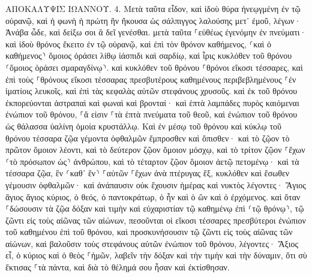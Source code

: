 \documentclass[twoside, 9pt]{extreport}
\begin{document}
ΑΠΟΚΑΛΥΨΙΣ ΙΩΑΝΝΟΥ.
4.
Μετὰ ταῦτα εἶδον, καὶ ἰδοὺ θύρα ἠνεῳγμένη ἐν τῷ οὐρανῷ, καὶ ἡ φωνὴ ἡ πρώτη ἣν ἤκουσα ὡς σάλπιγγος λαλούσης μετ᾽ ἐμοῦ, λέγων· Ἀνάβα ὧδε, καὶ δείξω σοι ἃ δεῖ γενέσθαι. μετὰ ταῦτα 
⸀εὐθέως ἐγενόμην ἐν πνεύματι· καὶ ἰδοὺ θρόνος ἔκειτο ἐν τῷ οὐρανῷ, καὶ ἐπὶ τὸν θρόνον καθήμενος, 
⸂καὶ ὁ καθήμενος⸃ ὅμοιος ὁράσει λίθῳ ἰάσπιδι καὶ σαρδίῳ, καὶ ἶρις κυκλόθεν τοῦ θρόνου ⸂ὅμοιος ὁράσει σμαραγδίνῳ⸃. 
καὶ κυκλόθεν τοῦ θρόνου ⸀θρόνοι εἴκοσι τέσσαρες, καὶ ἐπὶ τοὺς ⸀θρόνους εἴκοσι τέσσαρας πρεσβυτέρους καθημένους περιβεβλημένους ⸀ἐν ἱματίοις λευκοῖς, καὶ ἐπὶ τὰς κεφαλὰς αὐτῶν στεφάνους χρυσοῦς. 
καὶ ἐκ τοῦ θρόνου ἐκπορεύονται ἀστραπαὶ καὶ φωναὶ καὶ βρονταί· καὶ ἑπτὰ λαμπάδες πυρὸς καιόμεναι ἐνώπιον τοῦ θρόνου, ⸀ἅ εἰσιν ⸀τὰ ἑπτὰ πνεύματα τοῦ θεοῦ, 
καὶ ἐνώπιον τοῦ θρόνου ὡς θάλασσα ὑαλίνη ὁμοία κρυστάλλῳ. Καὶ ἐν μέσῳ τοῦ θρόνου καὶ κύκλῳ τοῦ θρόνου τέσσαρα ζῷα γέμοντα ὀφθαλμῶν ἔμπροσθεν καὶ ὄπισθεν· 
καὶ τὸ ζῷον τὸ πρῶτον ὅμοιον λέοντι, καὶ τὸ δεύτερον ζῷον ὅμοιον μόσχῳ, καὶ τὸ τρίτον ζῷον ⸀ἔχων ⸂τὸ πρόσωπον ὡς⸃ ἀνθρώπου, καὶ τὸ τέταρτον ζῷον ὅμοιον ἀετῷ πετομένῳ· 
καὶ τὰ τέσσαρα ζῷα, ἓν ⸂καθ᾽ ἓν⸃ ⸀αὐτῶν ⸀ἔχων ἀνὰ πτέρυγας ἕξ, κυκλόθεν καὶ ἔσωθεν γέμουσιν ὀφθαλμῶν· καὶ ἀνάπαυσιν οὐκ ἔχουσιν ἡμέρας καὶ νυκτὸς λέγοντες· Ἅγιος ἅγιος ἅγιος κύριος, ὁ θεός, ὁ παντοκράτωρ, ὁ ἦν καὶ ὁ ὢν καὶ ὁ ἐρχόμενος. 
καὶ ὅταν ⸀δώσουσιν τὰ ζῷα δόξαν καὶ τιμὴν καὶ εὐχαριστίαν τῷ καθημένῳ ἐπὶ ⸂τῷ θρόνῳ⸃, τῷ ζῶντι εἰς τοὺς αἰῶνας τῶν αἰώνων, 
πεσοῦνται οἱ εἴκοσι τέσσαρες πρεσβύτεροι ἐνώπιον τοῦ καθημένου ἐπὶ τοῦ θρόνου, καὶ προσκυνήσουσιν τῷ ζῶντι εἰς τοὺς αἰῶνας τῶν αἰώνων, καὶ βαλοῦσιν τοὺς στεφάνους αὐτῶν ἐνώπιον τοῦ θρόνου, λέγοντες· 
Ἄξιος εἶ, ὁ κύριος καὶ ὁ θεὸς ⸀ἡμῶν, λαβεῖν τὴν δόξαν καὶ τὴν τιμὴν καὶ τὴν δύναμιν, ὅτι σὺ ἔκτισας ⸀τὰ πάντα, καὶ διὰ τὸ θέλημά σου ἦσαν καὶ ἐκτίσθησαν. 
\end{document}
